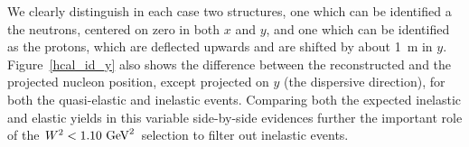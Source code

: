 \documentclass[11pt]{article}
\begin{document}
%
We clearly distinguish in each case two structures, one which can be identified a the neutrons, centered on zero in both $x$ and $y$, and one which can be identified as the protons, which are deflected upwards and are shifted by about 1~m in $y$.
Figure~\ref{hcal_id_y} also shows the difference between the reconstructed and the projected nucleon position, except projected on $y$ (the dispersive direction), for both the quasi-elastic and inelastic events. Comparing both the expected inelastic and elastic yields in this variable side-by-side evidences further the important role of the $W^2<1.10~{\rm GeV}^2$ selection to filter out inelastic events. 
%

%
\end{document}
